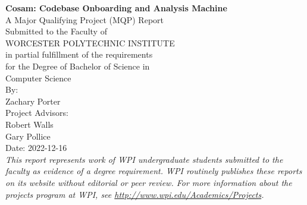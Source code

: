 
 



\begin{center}
    \Huge{\textbf{Cosam: Codebase Onboarding and Analysis Machine}} \\ %
    \vspace{10mm} %
    \large{
    A Major Qualifying Project (MQP) Report \\
    Submitted to the Faculty of \\
    WORCESTER POLYTECHNIC INSTITUTE \\
    in partial fulfillment of the requirements \\
    for the Degree of Bachelor of Science in \\
    } %
    \Large{
    \vspace{5mm} %
    Computer Science \\ %
    \vspace{10mm} %
    By: \\
    \vspace{5mm} %
    Zachary Porter \\ %
    \vspace {15mm} %
    Project Advisors: \\ %
    \vspace{5mm} %
    Robert Walls \\ %
    Gary Pollice \\  %
    \vspace {15mm} %
    Date: 2022-12-16 \\ %
    }
    \vspace{10mm} %
    \large{\textit{This report represents work of WPI undergraduate students submitted to the faculty as evidence of a degree requirement. WPI routinely publishes these reports on its website without editorial or peer review. For more information about the projects program at WPI, see \url{http://www.wpi.edu/Academics/Projects}.}} %
\end{center}

